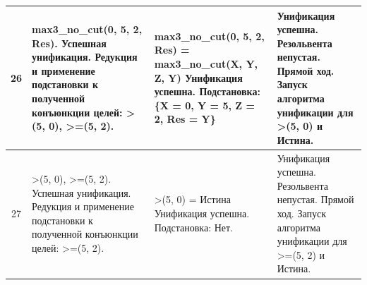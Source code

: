 \begin{tabularx}{\textwidth}{|c|>{\small}X|>{\small}X|>{\small}X|}
	26                                                                                 &
	max3\_no\_cut(0, 5, 2, Res). \newline
	Успешная унификация. \newline
	Редукция и применение подстановки к полученной конъюнкции целей: \newline
	>(5, 0), \newline
	>=(5, 2).                                                                          &
	max3\_no\_cut(0, 5, 2, Res) = max3\_no\_cut(X, Y, Z, Y) \newline
	Унификация успешна. \newline
	Подстановка: \newline
	\{X = 0, Y = 5, Z = 2, Res = Y\}                                                   &
	Унификация успешна. \newline
	Резольвента непустая. \newline
	Прямой ход. \newline
	Запуск алгоритма унификации для >(5, 0) и Истина.                                            \\
	\hline

	27                                                                                 &
	>(5, 0), \newline
	>=(5, 2). \newline
	Успешная унификация. \newline
	Редукция и применение подстановки к полученной конъюнкции целей: \newline
	>=(5, 2).                                                                          &
	>(5, 0) = \newline
	Истина \newline
	Унификация успешна. \newline
	Подстановка: \newline
	Нет.                                                                               &
	Унификация успешна. \newline
	Резольвента непустая. \newline
	Прямой ход. \newline
	Запуск алгоритма унификации для >=(5, 2) и Истина.                                           \\
	\hline


\end{tabularx}
